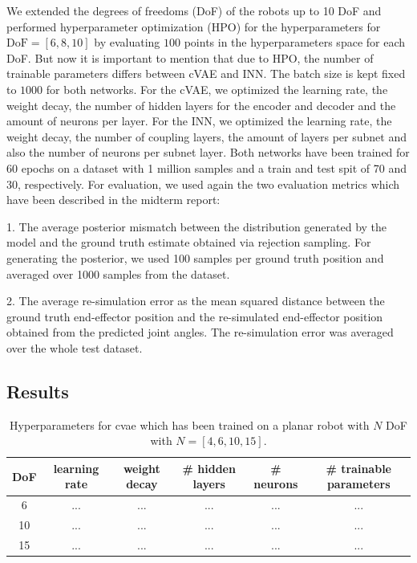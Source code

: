 \documentclass[conference]{IEEEtran}
\begin{document}
We extended the degrees of freedoms (DoF) of the robots up to 10 DoF and performed hyperparameter optimization (HPO) for the hyperparameters for $ \text{DoF} = [6, 8, 10]$ by evaluating $100$ points in the hyperparameters space for each DoF. But now it is important to mention that due to HPO, the number of trainable parameters differs between cVAE and INN. The batch size is kept fixed to $1000$ for both networks.
For the cVAE, we optimized the learning rate, the weight decay, the number of hidden layers for the encoder and decoder and the amount of neurons per layer. For the INN, we optimized the learning rate, the weight decay, the number of coupling layers, the amount of layers per subnet and also the number of neurons per subnet layer.
Both networks have been trained for 60 epochs on a dataset with 1 million samples and a train and test spit of 70 and 30, respectively. For evaluation, we used again the two evaluation metrics which have been described in the midterm report:

1. The average posterior mismatch between the distribution generated by the model and the ground truth estimate obtained via rejection sampling. For generating the posterior, we used 100 samples per ground truth position and averaged over 1000 samples from the dataset.

2. The average re-simulation error as the mean squared distance between the ground truth end-effector position and the re-simulated end-effector position obtained from the predicted joint angles. The re-simulation error was averaged over the whole test dataset.

\subsection*{Results}

\begin{table}[h]
\centering
\begin{tabular}{|c|c|c|c|c|c|}
\hline
 DoF & learning rate & weight decay & \# hidden layers & \# neurons & \# trainable parameters\\
 \hline
 6  & ... & ...& ... & ... & ...\\
 10  & ... & ... & ... & ... & ...\\
 15  & ... & ... & ... & ... & ...\\
 \hline
\end{tabular}
\vspace{5pt}
\caption{\label{tab:results:cvae}  Hyperparameters for cvae which has been trained on a planar robot with $N$ DoF with $N=[4, 6, 10, 15]$.}
\end{table}
\end{document}
